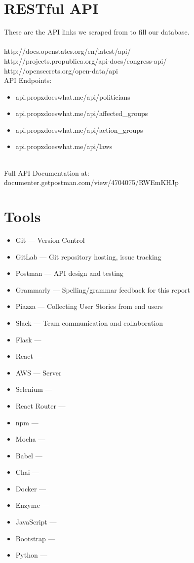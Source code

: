 \documentclass[12pt]{article}
\begin{document}
\section{RESTful API}
These are the API links we scraped from to fill our database.\\ \\http://docs.openstates.org/en/latest/api/ \\http://projects.propublica.org/api-docs/congress-api/ \\http://opensecrets.org/open-data/api\\

API Endpoints: \\

\begin{itemize}
	\item api.propxdoeswhat.me/api/politicians
	\item api.propxdoeswhat.me/api/affected\_groups
	\item api.propxdoeswhat.me/api/action\_groups
	\item api.propxdoeswhat.me/api/laws
\end{itemize}

~\\
Full API Documentation at: documenter.getpostman.com/view/4704075/RWEmKHJp

\section{Tools}

\begin{itemize}
	\item Git		--- Version Control
	\item GitLab	--- Git repository hosting, issue tracking
	\item Postman	--- API design and testing %
	\item Grammarly	--- Spelling/grammar feedback for this report
	\item Piazza	--- Collecting User Stories from end users
	\item Slack		--- Team communication and collaboration
	\item Flask     --- 
	\item React     ---
	\item AWS       --- Server
	\item Selenium --- 
	\item React Router --- 
	\item npm --- 
	\item Mocha --- 
	\item Babel --- 
	\item Chai --- 
	\item Docker --- 
	\item Enzyme --- 
	\item JavaScript --- 
	\item Bootstrap --- 
	\item Python --- 

\end{itemize}
\end{document}
